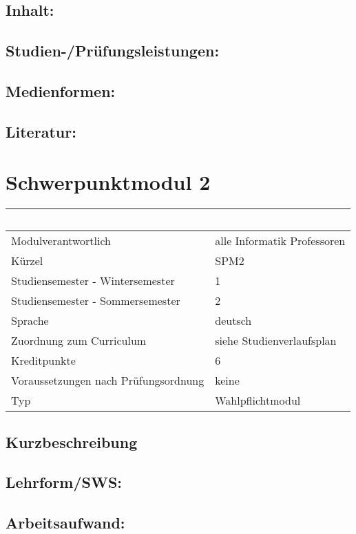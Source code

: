 \section*{Inhalt:}\label{inhalt-3}

\section*{Studien-/Prüfungsleistungen:}\label{studien-pruxfcfungsleistungen-3}

\section*{Medienformen:}\label{medienformen-3}

\section*{Literatur:}\label{literatur-3}

\chapter{Schwerpunktmodul 2}\label{schwerpunktmodul-2}

\begin{longtable}[]{@{}ll@{}}
\toprule
~ & ~\tabularnewline
\midrule
\endhead
Modulverantwortlich & alle Informatik Professoren\tabularnewline
Kürzel & SPM2\tabularnewline
Studiensemester - Wintersemester & 1\tabularnewline
Studiensemester - Sommersemester & 2\tabularnewline
Sprache & deutsch\tabularnewline
Zuordnung zum Curriculum & siehe Studienverlaufsplan\tabularnewline
Kreditpunkte & 6\tabularnewline
Voraussetzungen nach Prüfungsordnung & keine\tabularnewline
Typ & Wahlpflichtmodul\tabularnewline
\bottomrule
\end{longtable}

\section*{Kurzbeschreibung}\label{kurzbeschreibung-3}

\section*{Lehrform/SWS:}\label{lehrformsws-4}

\section*{Arbeitsaufwand:}\label{arbeitsaufwand-4}

